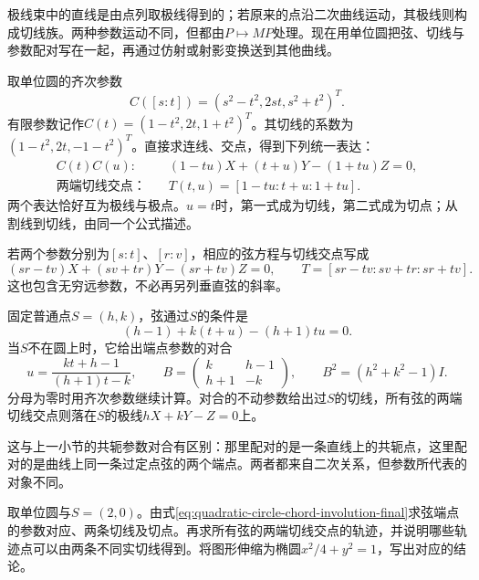 极线束中的直线是由点列取极线得到的；若原来的点沿二次曲线运动，其极线则构成切线族。两种参数运动不同，但都由\(P\mapsto MP\)处理。现在用单位圆把弦、切线与参数配对写在一起，再通过仿射或射影变换送到其他曲线。

取单位圆的齐次参数
\begin{equation*}
 C([s:t])=(s^2-t^2,2st,s^2+t^2)^T.
\end{equation*}
有限参数记作\(C(t)=(1-t^2,2t,1+t^2)^T\)。其切线的系数为\((1-t^2,2t,-1-t^2)^T\)。直接求连线、交点，得到下列统一表达：
\begin{equation}\label{eq:quadratic-circle-chord-pole-parameters}
 \begin{aligned}
 C(t)C(u):\quad &(1-tu)X+(t+u)Y-(1+tu)Z=0,\\
 \text{两端切线交点：}\quad &T(t,u)=[1-tu:t+u:1+tu].
 \end{aligned}
\end{equation}
两个表达恰好互为极线与极点。\(u=t\)时，第一式成为切线，第二式成为切点；从割线到切线，由同一个公式描述。

若两个参数分别为\([s:t]\)、\([r:v]\)，相应的弦方程与切线交点写成
\begin{equation*}
 (sr-tv)X+(sv+tr)Y-(sr+tv)Z=0,
 \qquad T=[sr-tv:sv+tr:sr+tv].
\end{equation*}
这也包含无穷远参数，不必再另列垂直弦的斜率。

固定普通点\(S=(h,k)\)，弦通过\(S\)的条件是
\begin{equation*}
 (h-1)+k(t+u)-(h+1)tu=0.
\end{equation*}
当\(S\)不在圆上时，它给出端点参数的对合
\begin{equation}\label{eq:quadratic-circle-chord-involution-final}
 u=\frac{kt+h-1}{(h+1)t-k},\qquad
 B=\begin{pmatrix}k&h-1\\h+1&-k\end{pmatrix},\qquad
 B^2=(h^2+k^2-1)I.
\end{equation}
分母为零时用齐次参数继续计算。对合的不动参数给出过\(S\)的切线，所有弦的两端切线交点则落在\(S\)的极线\(hX+kY-Z=0\)上。

这与上一小节的共轭参数对合有区别：那里配对的是一条直线上的共轭点，这里配对的是曲线上同一条过定点弦的两个端点。两者都来自二次关系，但参数所代表的对象不同。

\begin{example}
取单位圆与\(S=(2,0)\)。由式\eqref{eq:quadratic-circle-chord-involution-final}求弦端点的参数对应、两条切线及切点。再求所有弦的两端切线交点的轨迹，并说明哪些轨迹点可以由两条不同实切线得到。将图形伸缩为椭圆\(x^2/4+y^2=1\)，写出对应的结论。
\end{example}

